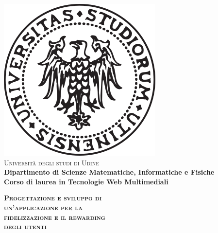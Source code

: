 \begin{titlepage}
\begin{center}
    \includegraphics[scale=0.35]{logo.png}\\
    \vspace{8mm}
    {\huge{\textsc{\textmd{Università degli studi di Udine}}}}\\
    \vspace{10mm}
    {\large{\textbf{ Dipartimento di Scienze Matematiche, Informatiche e Fisiche}}}\\
    \vspace{0.5cm}
    {\large{\textbf{ Corso di laurea in Tecnologie Web Multimediali}}}
\end{center}
\vspace{10mm}
\begin{center}
    {\LARGE\textbf{\textsc{Progettazione e sviluppo di}}}\\
    \vspace{6mm}
    {\LARGE\textbf{\textsc{un'applicazione per la}}}\\
    \vspace{6mm}
    {\LARGE\textbf{\textsc{fidelizzazione e il rewarding}}}\\
    \vspace{6mm}
    {\LARGE\textsc{\textbf{degli utenti}}}\\
    \vspace{10mm}
\end{center}
\vfill
\par
\noindent


\end{titlepage}
